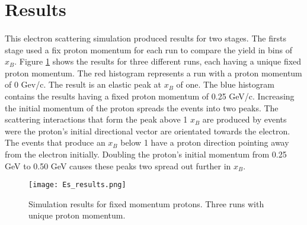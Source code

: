 \section{Results}
\paragraph{}This electron scattering simulation produced results for two stages. The firsts stage used a fix proton momentum for each run to compare the yield in bins of $x_B$. Figure \ref{ES_res} shows the results for three different runs, each having a unique fixed proton momentum. The red histogram represents a run with a proton momentum of 0 Gev/c. The result is an elastic peak at $x_B$ of one. The blue histogram contains the results having a fixed proton momentum of 0.25 GeV/c. Increasing the initial momentum of the proton spreads the events into two peaks. The scattering interactions that form the peak above 1 $x_B$ are produced by events were the proton's initial directional vector are orientated towards the electron. The events that produce an $x_B$ below 1 have a proton direction pointing away from the electron initially. Doubling the proton's initial momentum from 0.25 GeV to 0.50 GeV causes these peaks two spread out further in $x_B$.  


\begin{figure}[t!]
\centering
\texttt{[image: Es\_results.png]}
\caption{Simulation results for fixed momentum protons. Three runs with unique proton momentum. }
\label{ES_res}
\end{figure}

